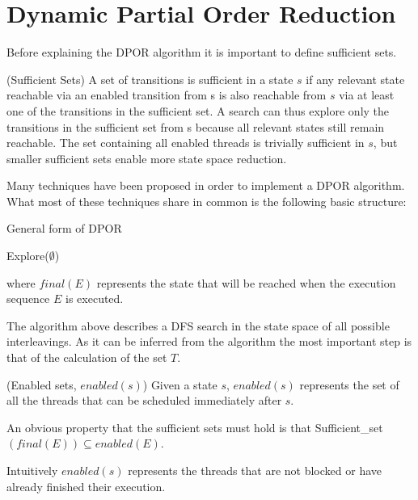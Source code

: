 \section{Dynamic Partial Order Reduction}

Before explaining the DPOR algorithm it is important to define sufficient sets.

\begin{definition}{(Sufficient Sets)}
A set of transitions is sufficient in a state $s$ if any relevant
state reachable via an enabled transition from s is also reachable from $s$ via at least one of the transitions in the sufficient
set. A search can thus explore only the transitions in the
sufficient set from s because all relevant states still remain
reachable. The set containing all enabled threads is trivially
sufficient in $s$, but smaller sufficient sets enable more state
space reduction.
\end{definition}

Many techniques have been proposed in order to implement a DPOR algorithm. What most of these techniques share in common is the following basic structure:

\begin{algorithm}[H]
    \caption{General form of DPOR}
    Explore($\emptyset$)\;
\end{algorithm}

where $final(E)$ represents the state that will be reached when the execution sequence $E$ is executed.

The algorithm above describes a DFS search in the state space of all possible interleavings.
As it can be inferred from the algorithm the most important step is that of the calculation of the set $T$.

\begin{definition}{(Enabled sets, $enabled(s)$)}
    Given a state $s$, $enabled(s)$ represents the set of all the threads that can be scheduled immediately after $s$.
\end{definition}

An obvious property that the sufficient sets must hold is that Sufficient\_set$(final(E)) \subseteq enabled(E)$.

Intuitively $enabled(s)$ represents the threads that are not blocked or have already finished their execution.

